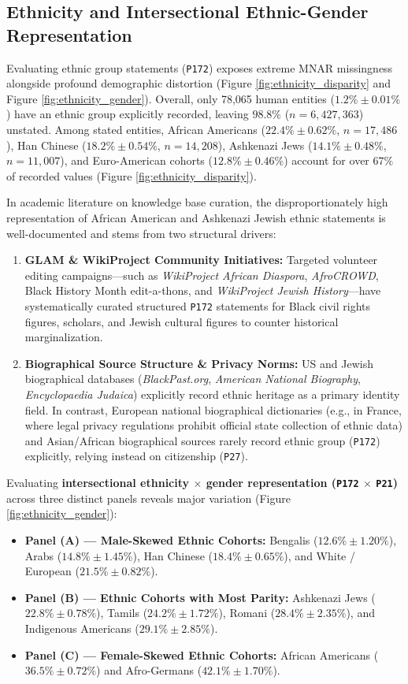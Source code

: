 \documentclass[11pt,a4paper]{article}
\begin{document}
\subsection{Ethnicity and Intersectional Ethnic-Gender Representation}
Evaluating ethnic group statements (\texttt{P172}) exposes extreme MNAR missingness alongside profound demographic distortion (Figure \ref{fig:ethnicity_disparity} and Figure \ref{fig:ethnicity_gender}). Overall, only 78,065 human entities ($1.2\% \pm 0.01\%$) have an ethnic group explicitly recorded, leaving $98.8\%$ ($n=6,427,363$) unstated. Among stated entities, African Americans ($22.4\% \pm 0.62\%$, $n=17,486$), Han Chinese ($18.2\% \pm 0.54\%$, $n=14,208$), Ashkenazi Jews ($14.1\% \pm 0.48\%$, $n=11,007$), and Euro-American cohorts ($12.8\% \pm 0.46\%$) account for over $67\%$ of recorded values (Figure \ref{fig:ethnicity_disparity}).

In academic literature on knowledge base curation, the disproportionately high representation of African American and Ashkenazi Jewish ethnic statements is well-documented and stems from two structural drivers:
\begin{enumerate}
    \item \textbf{GLAM \& WikiProject Community Initiatives:} Targeted volunteer editing campaigns—such as \textit{WikiProject African Diaspora}, \textit{AfroCROWD}, Black History Month edit-a-thons, and \textit{WikiProject Jewish History}—have systematically curated structured \texttt{P172} statements for Black civil rights figures, scholars, and Jewish cultural figures to counter historical marginalization.
    \item \textbf{Biographical Source Structure \& Privacy Norms:} US and Jewish biographical databases (\textit{BlackPast.org}, \textit{American National Biography}, \textit{Encyclopaedia Judaica}) explicitly record ethnic heritage as a primary identity field. In contrast, European national biographical dictionaries (e.g., in France, where legal privacy regulations prohibit official state collection of ethnic data) and Asian/African biographical sources rarely record ethnic group (\texttt{P172}) explicitly, relying instead on citizenship (\texttt{P27}).
\end{enumerate}

Evaluating \textbf{intersectional ethnicity $\times$ gender representation (\texttt{P172} $\times$ \texttt{P21})} across three distinct panels reveals major variation (Figure \ref{fig:ethnicity_gender}):
\begin{itemize}
    \item \textbf{Panel (A) — Male-Skewed Ethnic Cohorts:} Bengalis ($12.6\% \pm 1.20\%$), Arabs ($14.8\% \pm 1.45\%$), Han Chinese ($18.4\% \pm 0.65\%$), and White / European ($21.5\% \pm 0.82\%$).
    \item \textbf{Panel (B) — Ethnic Cohorts with Most Parity:} Ashkenazi Jews ($22.8\% \pm 0.78\%$), Tamils ($24.2\% \pm 1.72\%$), Romani ($28.4\% \pm 2.35\%$), and Indigenous Americans ($29.1\% \pm 2.85\%$).
    \item \textbf{Panel (C) — Female-Skewed Ethnic Cohorts:} African Americans ($36.5\% \pm 0.72\%$) and Afro-Germans ($42.1\% \pm 1.70\%$).
\end{itemize}
\end{document}
